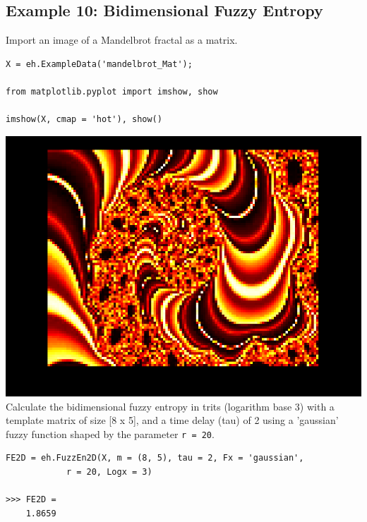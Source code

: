 \documentclass[12pt, a4paper, titlepage, openany]{book}
\begin{document}
\subsection{\normalsize Example 10: \hspace{15mm} Bidimensional Fuzzy Entropy}
\noindent Import an image of a Mandelbrot fractal as a matrix.
\begin{verbatim}
X = eh.ExampleData('mandelbrot_Mat');

from matplotlib.pyplot import imshow, show

imshow(X, cmap = 'hot'), show()
\end{verbatim}
\includegraphics[scale=.4]{mandelbrot.png}\newline \newline
Calculate the bidimensional fuzzy entropy in trits (logarithm base 3) with a template matrix of size [8 x 5], and a time delay (tau) of 2  using a 'gaussian' fuzzy function shaped by the parameter \texttt{r = 20}.
\begin{verbatim}
FE2D = eh.FuzzEn2D(X, m = (8, 5), tau = 2, Fx = 'gaussian',
			r = 20, Logx = 3)

>>> FE2D = 
	1.8659
\end{verbatim}












\end{document}
